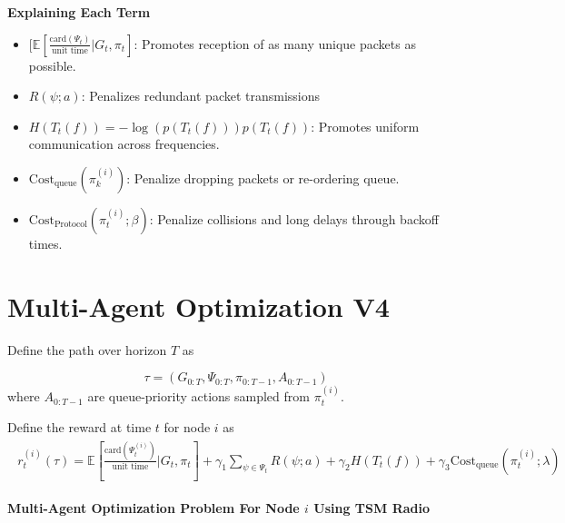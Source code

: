 \documentclass{article}
\begin{document}
\vspace{1 cm}

\textbf{Explaining Each Term}
\begin{itemize}
    \item $ [ \mathbb{E}[\frac{\text{card}(\Psi_{t})}{\text{unit time}} | G_{t}, \pi_{t}]$: Promotes reception of as many unique packets as possible.
    \item $R(\psi; a)$: Penalizes redundant packet transmissions
    \item $H(T_{t}(f))= -\log(p(T_{t}(f))) p(T_{t}(f))$: Promotes uniform communication across frequencies.
    \item $\text{Cost}_{\text{queue}}(\pi_{k}^{(i)})$: Penalize dropping packets or re-ordering queue.
    \item $\text{Cost}_{\text{Protocol}}(\pi_{t}^{(i)}; \beta)$: Penalize collisions and long delays through backoff times. 
\end{itemize}



\newpage


\section{Multi-Agent Optimization V4}

Define the path over horizon $T$ as

$$
\tau = (G_{0:T}, \Psi_{0:T}, \pi_{0:T-1}, A_{0:T-1})
$$
where $A_{0:T-1}$ are queue-priority actions sampled from $\pi_{t}^{(i)}$.

Define the reward at time $t$ for node $i$ as
\begin{align*}
    \begin{split}
            r_{t}^{(i)} (\tau)  =
            \mathbb{E}[\frac{\text{card}(\Psi_{t}^{(i)})}{\text{unit time}} | G_{t}, \pi_{t}] + \gamma_{1} \sum_{\psi \in \Psi_{t}} R(\psi; a) +
            \gamma_{2} H(T_{t}(f)) + \gamma_{3} \text{Cost}_{\text{queue}}(\pi_{t}^{(i)}; \lambda)
    \end{split}
\end{align*}\nonumber


\noindent \textbf{Multi-Agent Optimization Problem For Node $i$ Using TSM Radio}
\\
\noindent{}

\vspace{1 cm}
\end{document}
